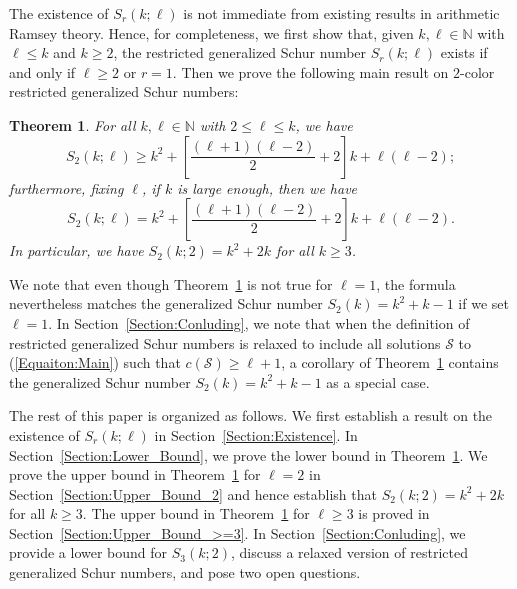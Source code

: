 \documentclass[11pt]{article}
\newtheorem{theorem}{Theorem}[section]
\theoremstyle{definition}
\begin{document}
The existence of $S_r(k;\ell)$ is not immediate from existing results in arithmetic Ramsey theory. Hence, for completeness, we first show that, given $k,\ell\in\mathbb{N}$ with $\ell\leq k$ and $k\geq2$, the restricted generalized Schur number $S_r(k;\ell)$ exists if and only if $\ell\geq2$ or $r=1$. Then we prove the following main result on $2$-color restricted generalized Schur numbers:

\begin{theorem}\label{Theorem:Main}
For all $k,\ell\in\mathbb{N}$ with $2\leq\ell\leq k$, we have
    \[
    S_2(k;\ell)\geq k^2+\left[\frac{(\ell+1)(\ell-2)}{2}+2\right]k+\ell(\ell-2);
    \]
furthermore, fixing $\ell$, if $k$ is large enough, then we have
 \[
    S_2(k;\ell)= k^2+\left[\frac{(\ell+1)(\ell-2)}{2}+2\right]k+\ell(\ell-2).
 \]
In particular, we have $S_2(k;2)=k^2+2k$ for all $k\geq3$.
\end{theorem}
We note that even though Theorem~\ref{Theorem:Main} is not true for $\ell=1$, the formula nevertheless matches the generalized Schur number $S_2(k)=k^2+k-1$ if we set $\ell=1$. In Section~\ref{Section:Conluding}, we note that when the definition of restricted generalized Schur numbers is relaxed to include all solutions $\mathcal{S}$ to (\ref{Equaiton:Main}) such that $c(\mathcal{S})\geq\ell+1$, a corollary of Theorem~\ref{Theorem:Main} contains the generalized Schur number $S_2(k)=k^2+k-1$ as a special case.

The rest of this paper is organized as follows. We first establish a result on the existence of $S_r(k;\ell)$ in Section~\ref{Section:Existence}. In Section~\ref{Section:Lower_Bound}, we prove the lower bound in Theorem~\ref{Theorem:Main}. We prove the upper bound in Theorem~\ref{Theorem:Main} for $\ell=2$ in Section~\ref{Section:Upper_Bound_2} and hence establish that $S_2(k;2)=k^2+2k$ for all $k\geq3$. The upper bound in Theorem~\ref{Theorem:Main} for $\ell\geq3$ is proved in Section~\ref{Section:Upper_Bound_>=3}. In Section~\ref{Section:Conluding}, we provide a lower bound for $S_3(k;2)$, discuss a relaxed version of restricted generalized Schur numbers, and pose two open questions.
\end{document}
